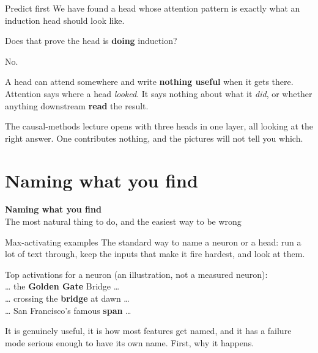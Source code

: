 \documentclass[aspectratio=169]{beamer}
\newcommand{\trapbox}[1]{%
  \begin{tcolorbox}[colback=armred!8, colframe=armred, boxrule=0.6pt, arc=2pt]
  #1
  \end{tcolorbox}}
\newcommand{\sectiontransition}[2]{%
  \begin{frame}[plain]
    \vfill
    \begin{center}
      {\Huge\bfseries\color{popblue} #1}\\[1.1em]
      {\large #2}
    \end{center}
    \vfill
  \end{frame}}
\begin{document}
\begin{frame}{Predict first}
  \vspace{0.9em}
  We have found a head whose attention pattern is exactly what an induction head should look
  like.

  \vspace{1.1em}
  \begin{center}
    {\large Does that prove the head is \textbf{doing} induction?}
  \end{center}

  \vspace{1.1em}
  \pause
  No.

  \vspace{0.5em}
  \trapbox{A head can attend somewhere and write \textbf{nothing useful} when it gets there.
  Attention says where a head \emph{looked}. It says nothing about what it \emph{did}, or
  whether anything downstream \textbf{read} the result.}

  \vspace{0.6em}
  The causal-methods lecture opens with three heads in one layer, all looking at the right answer.
  One contributes nothing, and the pictures will not tell you which.
\end{frame}

\section{Naming what you find}
\sectiontransition{Naming what you find}{The most natural thing to do, and the easiest way to be wrong}

\begin{frame}{Max-activating examples}
  \vspace{0.6em}
  The standard way to name a neuron or a head: run a lot of text through, keep the inputs that
  make it fire hardest, and look at them.

  \vspace{0.7em}
  \begin{center}
  \begin{tcolorbox}[colback=lightbg, colframe=gray, boxrule=0.5pt, arc=2pt, width=0.9\textwidth]
    \small
    Top activations for a neuron {\footnotesize\color{gray}(an illustration, not a measured
    neuron)}:\\[0.3em]
    \footnotesize
    \ldots{} the \textbf{Golden Gate} Bridge \ldots\\
    \ldots{} crossing the \textbf{bridge} at dawn \ldots\\
    \ldots{} San Francisco's famous \textbf{span} \ldots
  \end{tcolorbox}
  \end{center}

  \vspace{0.5em}
  It is genuinely useful, it is how most features get named, and it has a failure mode serious
  enough to have its own name. First, why it happens.
\end{frame}
\end{document}
